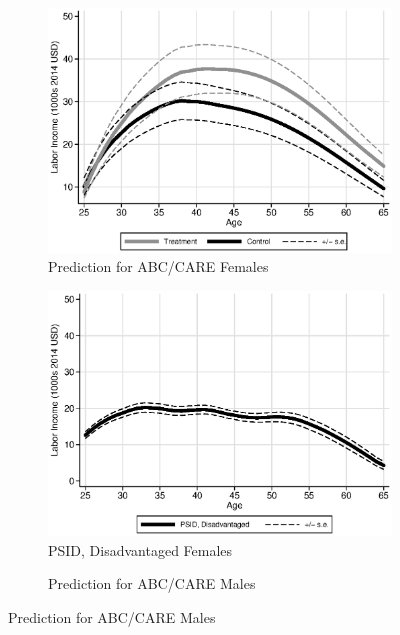 \begin{figure}
\centering
\caption{Labor Income Profile, Predictions and Comparison to PSID}\label{fig:labor-income-profiles}
\begin{subfigure}[h]{0.4\textwidth}
		\centering
		\caption{Prediction for ABC/CARE Females} \label{fig:abcare0}
		\includegraphics[width=\textwidth]{output/labor_25-60_female_1.eps}
\end{subfigure}%
\begin{subfigure}[h]{0.4\textwidth}
	\centering
	\caption{PSID, Disadvantaged Females} \label{fig:psid0}
		\includegraphics[width=\textwidth]{output/psid_disad_s0.eps}
\end{subfigure}
\begin{subfigure}[h]{0.4\textwidth}
		\centering
		\caption{Prediction for ABC/CARE Males} \label{fig:abcare1}

\end{subfigure}
\end{figure}

